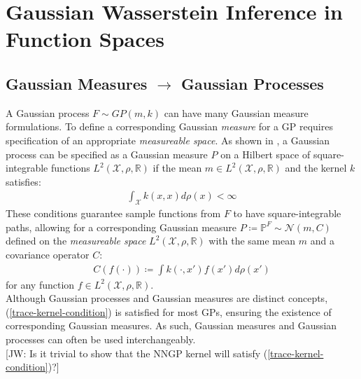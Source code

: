 \documentclass[twoside,11pt]{article}
\newcommand{\jw}[1]{{\color{gray} [JW: #1]}}
\begin{document}
\section{Gaussian Wasserstein Inference in Function Spaces}
\subsection{Gaussian Measures $\rightarrow$ Gaussian Processes \cite{wild2022generalized}}
A Gaussian process $F \sim GP(m, k)$ can have many Gaussian measure formulations. To define a corresponding Gaussian \textit{measure} for a GP requires specification of an appropriate \textit{measureable space}. As shown in \cite{wild2022generalized}, a Gaussian process can be specified as a Gaussian measure $P$ on a Hilbert space of square-integrable functions $L^2(\mathcal{X}, \rho, \mathbb{R})$ if the mean $m \in L^2(\mathcal{X}, \rho, \mathbb{R})$ and the kernel $k$ satisfies:
\begin{align}
    \int_{\mathcal{X}} k(x, x) d\rho(x) < \infty
    \label{trace-kernel-condition}
\end{align}
These conditions guarantee sample functions from $F$ to have square-integrable paths, allowing for a corresponding Gaussian measure $P \coloneqq \mathbb{P}^F \sim \mathcal{N}(m, C)$ defined on the \textit{measureable space} $L^2(\mathcal{X}, \rho, \mathbb{R})$ with the same mean $m$ and a covariance operator $C$:
\begin{align}
    C(f(\cdot)) \coloneqq \int k(\cdot, x')f(x')d \rho(x')
    \label{gm-covariance-operator}
\end{align}
for any function $f \in L^2(\mathcal{X}, \rho, \mathbb{R})$. \\
\newline 
Although Gaussian processes and Gaussian measures are distinct concepts, (\ref{trace-kernel-condition}) is satisfied for most GPs, ensuring the existence of corresponding Gaussian measures. As such, Gaussian measures and Gaussian processes can often be used interchangeably. %
\\\jw{Is it trivial to show that the NNGP kernel will satisfy (\ref{trace-kernel-condition})?}
\end{document}
